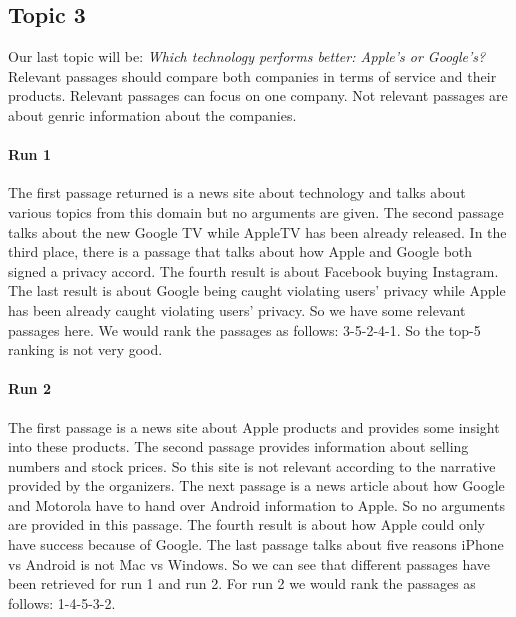 \subsection{Topic 3}

Our last topic will be:
\textit{Which technology performs better: Apple's or Google's?}
Relevant passages should compare both companies in terms of service and their products.
Relevant passages can focus on one company.
Not relevant passages are about genric information about the companies.

\paragraph{Run 1}

The first passage returned is a news site about technology and talks about various topics from this domain but no arguments are given.
The second passage talks about the new Google TV while AppleTV has been already released.
In the third place, there is a passage that talks about how Apple and Google both signed a privacy accord.
The fourth result is about Facebook buying Instagram.
The last result is about Google being caught violating users' privacy while Apple has been already caught violating users' privacy.
So we have some relevant passages here.
We would rank the passages as follows: 3-5-2-4-1.
So the top-5 ranking is not very good. 

\paragraph{Run 2}

The first passage is a news site about Apple products and provides some insight into these products.
The second passage provides information about selling numbers and stock prices.
So this site is not relevant according to the narrative provided by the organizers.
The next passage is a news article about how Google and Motorola have to hand over Android information to Apple.
So no arguments are provided in this passage.
The fourth result is about how Apple could only have success because of Google.
The last passage talks about five reasons iPhone vs Android is not Mac vs Windows.
So we can see that different passages have been retrieved for run 1 and run 2.
For run 2 we would rank the passages as follows: 1-4-5-3-2.

